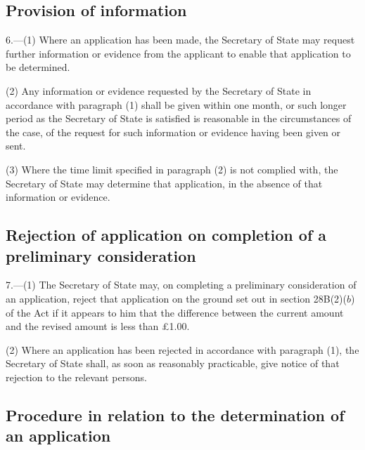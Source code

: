 \documentclass[12pt,a4paper]{article}
\begin{document}
\subsection[6. Provision of information]{Provision of information}

6.—(1) Where an application has been made, the Secretary
of State may request further information or evidence from the applicant to
enable that application to be determined.

(2) Any information or evidence requested by the Secretary of State in accordance with paragraph (1) shall be given within 
one month, or such longer period as the Secretary of State is satisfied is reasonable in the circumstances of the case,  %
of the request for such information or evidence having been given or sent.

(3) Where the time limit specified in paragraph (2) is not complied with, the
Secretary of State may determine that application, in the absence of that
information or evidence.


\subsection[7. Rejection of application on completion of a preliminary consideration]{Rejection of application on completion of a preliminary consideration}

7.—(1) The
Secretary of State may, on completing a preliminary consideration of an
application, reject that application on the ground set out in section 28B(2)($b$)
of the Act if it appears to him that the difference between the current amount
and the revised amount is less than £1.00.

(2) Where an application has been rejected in accordance with paragraph (1), the
Secretary of State shall, as soon as reasonably practicable, give notice of that
rejection to the relevant persons.

\subsection[8. Procedure in relation to the determination of an application]{Procedure in relation to the determination of an application}
\end{document}
